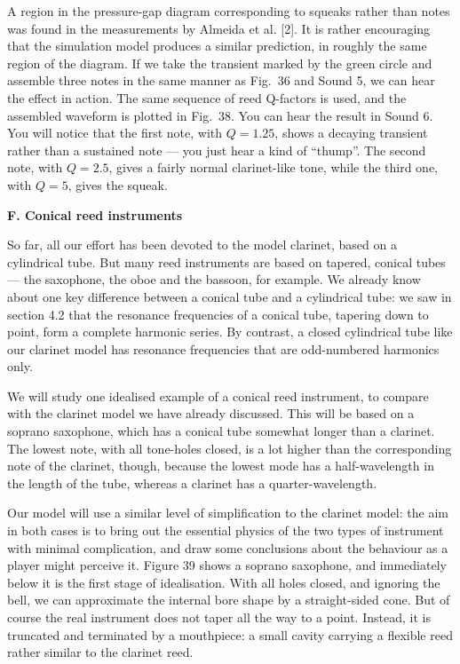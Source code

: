   A region in the pressure-gap diagram corresponding to squeaks rather than 
  notes was found in the measurements by Almeida et al. [2]. It is rather 
  encouraging that the simulation model produces a similar prediction, in 
  roughly the same region of the diagram. If we take the transient marked by 
  the green circle and assemble three notes in the same manner as Fig.\ 36 and 
  Sound 5, we can hear the effect in action. The same sequence of reed 
  Q-factors is used, and the assembled waveform is plotted in Fig.\ 38. You can 
  hear the result in Sound 6. You will notice that the first note, with 
  $Q=1.25$, shows a decaying transient rather than a sustained note --- you 
  just hear a kind of ``thump''. The second note, with $Q=2.5$, gives a fairly 
  normal clarinet-like tone, while the third one, with $Q=5$, gives the squeak. 


  \textbf{F. Conical reed instruments} 

  So far, all our effort has been devoted to the model clarinet, based on a 
  cylindrical tube. But many reed instruments are based on tapered, conical 
  tubes — the saxophone, the oboe and the bassoon, for example. We already know 
  about one key difference between a conical tube and a cylindrical tube: we 
  saw in section 4.2 that the resonance frequencies of a conical tube, tapering 
  down to point, form a complete harmonic series. By contrast, a closed 
  cylindrical tube like our clarinet model has resonance frequencies that are 
  odd-numbered harmonics only. 

  We will study one idealised example of a conical reed instrument, to compare 
  with the clarinet model we have already discussed. This will be based on a 
  soprano saxophone, which has a conical tube somewhat longer than a clarinet. 
  The lowest note, with all tone-holes closed, is a lot higher than the 
  corresponding note of the clarinet, though, because the lowest mode has a 
  half-wavelength in the length of the tube, whereas a clarinet has a 
  quarter-wavelength. 

  Our model will use a similar level of simplification to the clarinet model: 
  the aim in both cases is to bring out the essential physics of the two types 
  of instrument with minimal complication, and draw some conclusions about the 
  behaviour as a player might perceive it. Figure 39 shows a soprano saxophone, 
  and immediately below it is the first stage of idealisation. With all holes 
  closed, and ignoring the bell, we can approximate the internal bore shape by 
  a straight-sided cone. But of course the real instrument does not taper all 
  the way to a point. Instead, it is truncated and terminated by a mouthpiece: 
  a small cavity carrying a flexible reed rather similar to the clarinet reed. 

